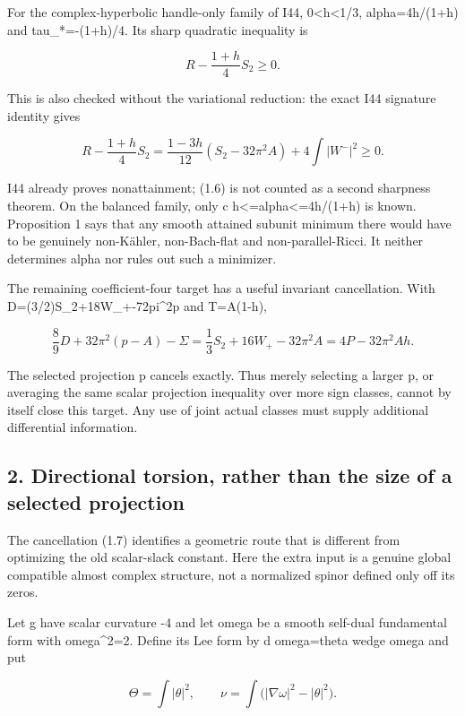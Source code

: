 \documentclass[
  10pt,
]{article}
\begin{document}
For the complex-hyperbolic handle-only family of I44,
0\textless h\textless1/3, alpha=4h/(1+h) and tau\_*=-(1+h)/4. Its sharp
quadratic inequality is

\[
 R-\frac{1+h}{4}S_2\ge0.                            \tag{1.6}
\]

This is also checked without the variational reduction: the exact I44
signature identity gives

\[
 R-\frac{1+h}{4}S_2
 =\frac{1-3h}{12}(S_2-32\pi^2A)+4\int|W^-|^2\ge0.
\]

I44 already proves nonattainment; (1.6) is not counted as a second
sharpness theorem. On the balanced family, only c
h\textless=alpha\textless=4h/(1+h) is known. Proposition 1 says that any
smooth attained subunit minimum there would have to be genuinely
non-Kähler, non-Bach-flat and non-parallel-Ricci. It neither determines
alpha nor rules out such a minimizer.

The remaining coefficient-four target has a useful invariant
cancellation. With D=(3/2)S\_2+18W\_+-72pi\^{}2p and T=A(1-h),

\[
 \frac89D+32\pi^2(p-A)-\Sigma
 =\frac13S_2+16W_+-32\pi^2A
 =4P-32\pi^2Ah.                                    \tag{1.7}
\]

The selected projection p cancels exactly. Thus merely selecting a
larger p, or averaging the same scalar projection inequality over more
sign classes, cannot by itself close this target. Any use of joint
actual classes must supply additional differential information.

\hypertarget{directional-torsion-rather-than-the-size-of-a-selected-projection}{%
\subsection{2. Directional torsion, rather than the size of a selected
projection}\label{directional-torsion-rather-than-the-size-of-a-selected-projection}}

The cancellation (1.7) identifies a geometric route that is different
from optimizing the old scalar-slack constant. Here the extra input is a
genuine global compatible almost complex structure, not a normalized
spinor defined only off its zeros.

Let g have scalar curvature -4 and let omega be a smooth self-dual
fundamental form with \textbar omega\textbar\^{}2=2. Define its Lee form
by d omega=theta wedge omega and put

\[
 \Theta=\int|\theta|^2,\qquad
 \nu=\int\bigl(|\nabla\omega|^2-|\theta|^2\bigr).
\]
\end{document}
